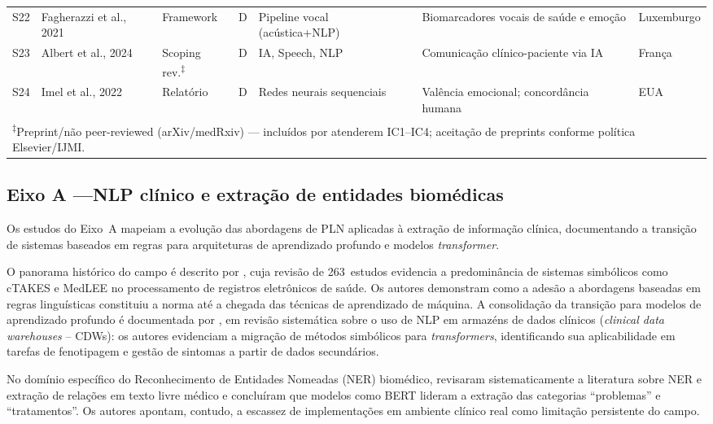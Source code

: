 \documentclass[a4paper,fleqn]{cas-sc}
\begin{document}
\begin{longtable}{p{0.65cm} p{2.4cm} p{1.55cm} p{0.55cm} p{2.2cm} p{2.35cm} p{1.4cm}}
S22 & Fagherazzi et al., 2021 & Framework   & D & Pipeline vocal (acústica+NLP) & Biomarcadores vocais de saúde e emoção & Luxemburgo  \\
S23 & Albert et al., 2024    & Scoping rev.\textsuperscript{‡} & D & IA, Speech, NLP & Comunicação clínico-paciente via IA & França  \\
S24 & Imel et al., 2022      & Relatório    & D & Redes neurais sequenciais  & Valência emocional; concordância humana & EUA          \\
\midrule
\multicolumn{7}{l}{\footnotesize\parbox{13.5cm}{%
  \textsuperscript{‡}Preprint/não peer-reviewed (arXiv/medRxiv) --- incluídos por atenderem IC1--IC4; aceitação de preprints conforme política Elsevier/IJMI.}} \\
\end{longtable}

\subsection{Eixo A —NLP clínico e extração de entidades biomédicas}
\label{subsec:eixoA}

Os estudos do Eixo~A mapeiam a evolução das abordagens de PLN
aplicadas à extração de informação clínica, documentando a transição
de sistemas baseados em regras para arquiteturas de aprendizado
profundo e modelos \textit{transformer}.

O panorama histórico do campo é descrito por \citet{Wang2018}, cuja
revisão de 263~estudos evidencia a predominância de sistemas
simbólicos como cTAKES e MedLEE no processamento de registros
eletrônicos de saúde. Os autores demonstram como a adesão a
abordagens baseadas em regras linguísticas constituiu a norma até a
chegada das técnicas de aprendizado de máquina. A consolidação da
transição para modelos de aprendizado profundo é documentada por
\citet{Bazoge2023}, em revisão sistemática sobre o uso de NLP em
armazéns de dados clínicos (\textit{clinical data warehouses} --
CDWs): os autores evidenciam a migração de métodos simbólicos para
\textit{transformers}, identificando sua aplicabilidade em tarefas de
fenotipagem e gestão de sintomas a partir de dados secundários.

No domínio específico do Reconhecimento de Entidades Nomeadas (NER)
biomédico, \citet{Navarro2023} revisaram sistematicamente a literatura
sobre NER e extração de relações em texto livre médico e concluíram
que modelos como BERT lideram a extração das categorias ``problemas''
e ``tratamentos''. Os autores apontam, contudo, a escassez de
implementações em ambiente clínico real como limitação persistente
do campo.
\end{document}
